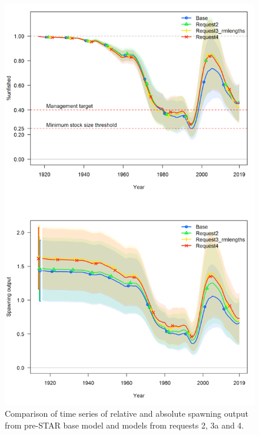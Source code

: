 \documentclass[12pt,]{article}
\begin{document}
\begin{figure}
\centering
\includegraphics{Figures/STAR_request3.png}
\caption{Comparison of time series of relative and absolute spawning
output from pre-STAR base model and models from requests 2, 3a and 4.
\label{fig:STAR_request3}}
\end{figure}

\FloatBarrier
\end{document}
